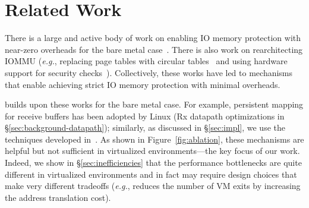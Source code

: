 \section{Related Work}
\label{sec:related}

There is a large and active body of work on enabling IO memory protection with near-zero overheads for the bare metal case~\cite{ben2007price, Malka2015rIOMMU, malka2015efficient, peleg2015utilizing, Markuze2016true, markuze2018damn, RajapakshaIOMMU, Rubin2024FastSafe}. There is also work on rearchitecting IOMMU (\textit{e.g.}, replacing page tables with circular tables~\cite{Malka2015rIOMMU}
    and using hardware support for security checks~\cite{RajapakshaIOMMU}). Collectively, these works have led to mechanisms that enable achieving strict IO memory protection with minimal overheads. 

{\name} builds upon these works for the bare metal case. For example, persistent
mapping for receive buffers has been adopted by Linux (Rx datapath optimizations in \S\ref{sec:background-datapath}); similarly, as discussed in \S\ref{sec:impl}, we use the techniques developed in~\cite{Rubin2024FastSafe}. As shown in Figure~\ref{fig:ablation}, these mechanisms are helpful but not sufficient in virtualized environments---the key focus of our work. Indeed, we show in \S\ref{sec:inefficiencies} that the performance bottlenecks are quite different in virtualized environments and in fact may require design choices that make very different tradeoffs (\textit{e.g.}, {\name} reduces the number of VM exits by increasing the address translation cost).
    

